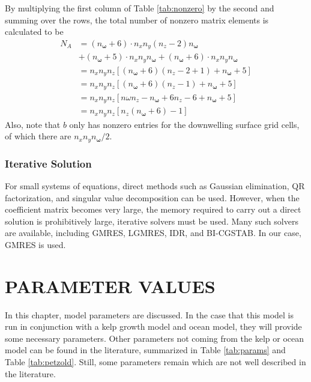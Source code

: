 \documentclass[ms,cpyr,lof,lot]{uathesis}
\renewcommand\vec\bm
\newcommand\nomega{{n_{\vec{\omega}}}}
\begin{document}
By multiplying the first column of Table \ref{tab:nonzero} by the second and summing over the rows, the total number of nonzero matrix elements is calculated to be
\begin{align*}
  N_A &= (\nomega+6) \cdot n_xn_y(n_z-2)\nomega \\
    &+   (\nomega+5) \cdot n_xn_y\nomega
    +   (\nomega+6) \cdot n_xn_y\nomega \\
  &= n_x n_y n_z \left[(\nomega+6)(n_z-2+1)+\nomega+5 \right] \\
  &= n_x n_y n_z \left[(\nomega+6)(n_z-1)+\nomega+5 \right] \\
  &=  n_x n_y n_z \left[n\omega n_z -\nomega + 6n_z - 6 + \nomega + 5 \right] \\
  &=  n_x n_y n_z \left[n_z(\nomega+6)-1\right]
\end{align*}
Also, note that $b$ only has nonzero entries for the downwelling surface grid cells, of which there are $n_x n_y \nomega/2$.

\subsection{Iterative Solution}
For small systems of equations, direct methods such as Gaussian elimination, QR factorization, and singular value decomposition can be used.
However, when the coefficient matrix becomes very large, the memory required to carry out a direct solution is prohibitively large, iterative solvers must be used.
Many such solvers are available, including GMRES\cite{saad_gmres:_1985}, LGMRES\cite{baker_technique_2005}, IDR\cite{sonneveld_idrs:_2008}, and BI-CGSTAB\cite{van_der_vorst_bi-cgstab:_1992}.
In our case, GMRES is used.

 \chapter{PARAMETER VALUES}
\label{chap:parameters}
In this chapter, model parameters are discussed.
In the case that this model is run in conjunction with a kelp growth model and ocean model,
they will provide some necessary parameters.
Other parameters not coming from the kelp or ocean model can be found in the literature,
summarized in Table \ref{tab:params} and Table \ref{tab:petzold}.
Still, some parameters remain which are not well described in the literature.
\end{document}
